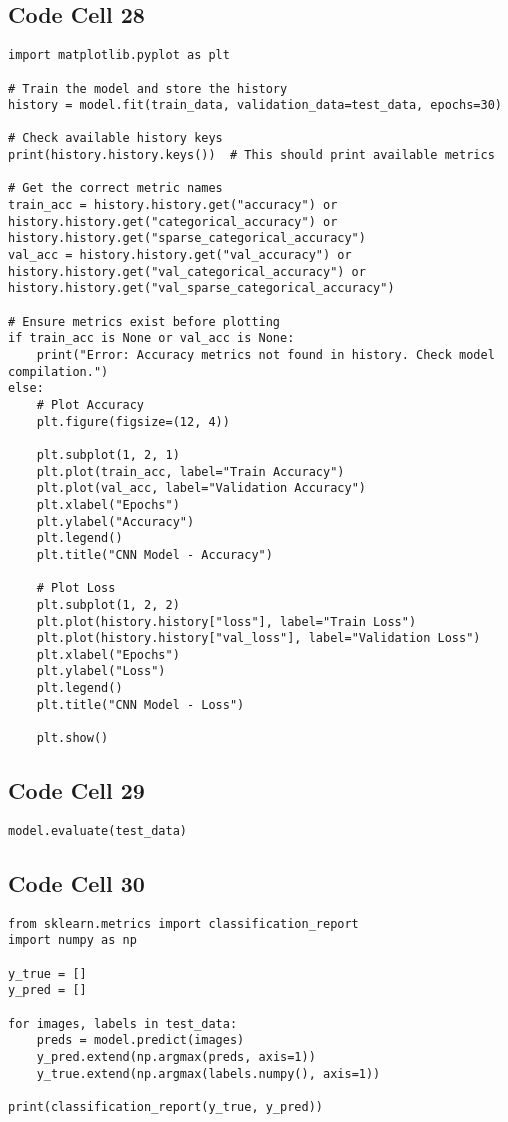 \documentclass{article}
\begin{document}
\subsection*{Code Cell 28}
\begin{lstlisting}
import matplotlib.pyplot as plt

# Train the model and store the history
history = model.fit(train_data, validation_data=test_data, epochs=30)

# Check available history keys
print(history.history.keys())  # This should print available metrics

# Get the correct metric names
train_acc = history.history.get("accuracy") or history.history.get("categorical_accuracy") or history.history.get("sparse_categorical_accuracy")
val_acc = history.history.get("val_accuracy") or history.history.get("val_categorical_accuracy") or history.history.get("val_sparse_categorical_accuracy")

# Ensure metrics exist before plotting
if train_acc is None or val_acc is None:
    print("Error: Accuracy metrics not found in history. Check model compilation.")
else:
    # Plot Accuracy
    plt.figure(figsize=(12, 4))

    plt.subplot(1, 2, 1)
    plt.plot(train_acc, label="Train Accuracy")
    plt.plot(val_acc, label="Validation Accuracy")
    plt.xlabel("Epochs")
    plt.ylabel("Accuracy")
    plt.legend()
    plt.title("CNN Model - Accuracy")

    # Plot Loss
    plt.subplot(1, 2, 2)
    plt.plot(history.history["loss"], label="Train Loss")
    plt.plot(history.history["val_loss"], label="Validation Loss")
    plt.xlabel("Epochs")
    plt.ylabel("Loss")
    plt.legend()
    plt.title("CNN Model - Loss")

    plt.show()

\end{lstlisting}

\subsection*{Code Cell 29}
\begin{lstlisting}
model.evaluate(test_data)
\end{lstlisting}

\subsection*{Code Cell 30}
\begin{lstlisting}
from sklearn.metrics import classification_report
import numpy as np

y_true = []
y_pred = []

for images, labels in test_data:
    preds = model.predict(images)
    y_pred.extend(np.argmax(preds, axis=1))
    y_true.extend(np.argmax(labels.numpy(), axis=1))

print(classification_report(y_true, y_pred))
\end{lstlisting}
\end{document}
